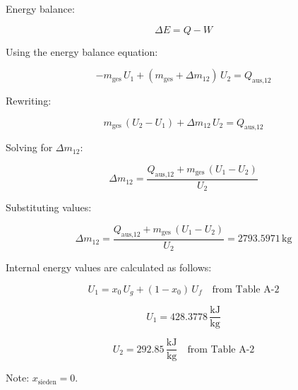 Energy balance:  

\[
\Delta E = Q - W
\]

Using the energy balance equation:  

\[
-m_{\text{ges}} \, U_1 + (m_{\text{ges}} + \Delta m_{12}) \, U_2 = Q_{\text{aus,12}}
\]

Rewriting:  

\[
m_{\text{ges}} \, (U_2 - U_1) + \Delta m_{12} \, U_2 = Q_{\text{aus,12}}
\]

Solving for \( \Delta m_{12} \):  

\[
\Delta m_{12} = \frac{Q_{\text{aus,12}} + m_{\text{ges}} \, (U_1 - U_2)}{U_2}
\]

Substituting values:  

\[
\Delta m_{12} = \frac{Q_{\text{aus,12}} + m_{\text{ges}} \, (U_1 - U_2)}{U_2} = 2793.5971 \, \text{kg}
\]

Internal energy values are calculated as follows:  

\[
U_1 = x_0 \, U_g + (1 - x_0) \, U_f \quad \text{from Table A-2}
\]

\[
U_1 = 428.3778 \, \frac{\text{kJ}}{\text{kg}}
\]

\[
U_2 = 292.85 \, \frac{\text{kJ}}{\text{kg}} \quad \text{from Table A-2}
\]

Note: \( x_{\text{sieden}} = 0 \).